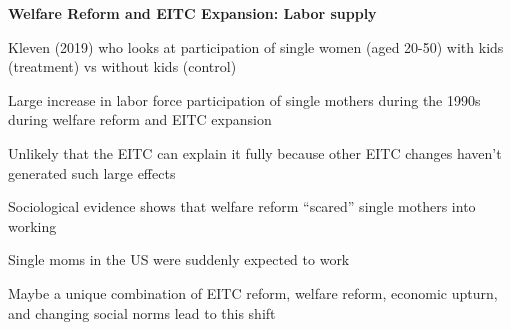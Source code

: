 \documentclass[landscape]{slides}
\begin{document}
%

\begin{slide}

\end{slide}




%
%
%
%
%
%
%


\begin{slide}

\end{slide}


\begin{slide}
\begin{center}
{\bf Welfare Reform and EITC Expansion: Labor supply}
\end{center}

Kleven (2019) who looks at participation of single women (aged 20-50)
with kids (treatment) vs without kids (control)

Large increase in labor force participation of single mothers during the 1990s
during welfare reform and EITC expansion 

Unlikely that the EITC can explain it fully because other EITC changes haven't generated
such large effects

Sociological evidence shows that welfare reform ``scared'' single mothers into working

Single moms in the US were suddenly expected to work

Maybe a unique combination of EITC reform, welfare reform,
economic upturn, and changing social norms lead to this shift


\end{slide}
\end{document}
